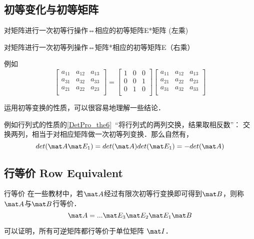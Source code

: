 \subsection{初等变化与初等矩阵}
\begin{theorem}{}
对矩阵进行一次初等行操作⇔相应的初等矩阵E*矩阵 (左乘)

对矩阵进行一次初等列操作⇔矩阵*相应的初等矩阵E（右乘）
\end{theorem}

\begin{example}{}
例如
\begin{equation}
\begin{bmatrix}
    a_{11} & a_{12} & a_{13}\\
    a_{31} & a_{32} & a_{33}\\
    a_{21} & a_{22} & a_{23}\\
\end{bmatrix}
=
    \begin{bmatrix}
        1 & 0 & 0\\
        0 & 0 & 1\\
        0 & 1 & 0\\
    \end{bmatrix}
\begin{bmatrix}
        a_{11} & a_{12} & a_{13}\\
        a_{21} & a_{22} & a_{23}\\
        a_{31} & a_{32} & a_{33}\\
\end{bmatrix}
\end{equation}
\end{example}

运用初等变换的性质，可以很容易地理解一些结论．

\begin{example}{}
例如行列式的性质的\autoref{DetPro_the6}~“将行列式的两列交换，结果取相反数”： 交换两列，相当于对相应矩阵做一次初等列变换．那么自然有，
$$det (\mat A \mat E_1)=det (\mat A) det(\mat E_1)=-det (\mat A)$$
\end{example}

\subsection{行等价 Row Equivalent}
\begin{definition}{行等价}
在一些教材中，若$\mat A$经过有限次初等行变换即可得到$\mat B$，则称$\mat A$与$\mat B$行等价．
\begin{equation}
\mat A= ... \mat E_3 \mat E_2 \mat E_1 \mat  B
\end{equation}
\end{definition}

可以证明，所有可逆矩阵都行等价于单位矩阵 $\mat I$．
